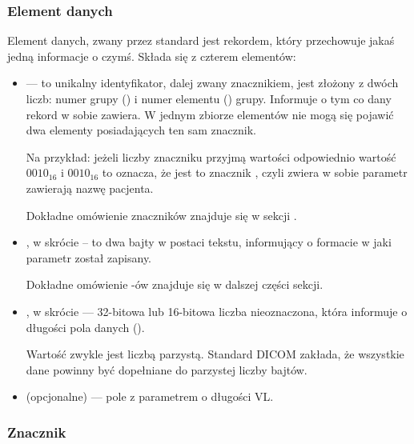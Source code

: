 \subsubsection{Element danych}

Element danych, zwany przez standard \DICOM {} jest rekordem, który przechowuje jakaś jedną informacje o czymś.
Składa się z czterem elementów:

\begin{itemize}

    \item {} --- to unikalny identyfikator, dalej zwany znacznikiem, jest złożony z dwóch liczb: numer grupy () i numer elementu () grupy.
          Informuje o tym co dany rekord w sobie zawiera.
          W jednym zbiorze elementów nie mogą się pojawić dwa elementy posiadających ten sam znacznik.

          Na przykład: jeżeli liczby znaczniku przyjmą wartości odpowiednio wartość $0010_{16}$ i $0010_{16}$ to oznacza, że jest to znacznik , czyli zwiera w sobie parametr zawierają nazwę pacjenta.

          Dokładne omówienie znaczników znajduje się w sekcji \label{sec:dicom-tag}.

    \item {}, w skrócie  – to dwa bajty w postaci tekstu, informujący o formacie w jaki parametr został zapisany.

          Dokładne omówienie -ów znajduje się w dalszej części sekcji.

    \item {}, w skrócie  --- 32-bitowa lub 16-bitowa liczba nieoznaczona, która informuje o długości pola danych ().

          Wartość  zwykle jest liczbą parzystą.
          Standard DICOM zakłada, że wszystkie dane powinny być dopełniane do parzystej liczby bajtów.

    \item {} (opcjonalne) --- pole z parametrem o długości VL.

\end{itemize}

\subsubsection{Znacznik}
\label{sec:dicom-tag}


